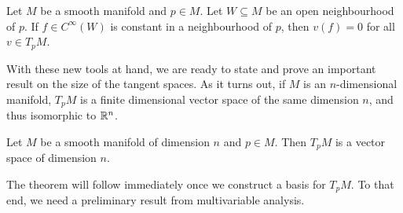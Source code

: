 \begin{corollary}\label{cor:derzero}
	Let $M$ be a smooth manifold and $p\in M$.
	Let $W\subseteq M$ be an open neighbourhood of $p$.
	If $f\in C^\infty(W)$ is constant in a neighbourhood of $p$, then $v(f) = 0$ for all $v\in T_p M$.
\end{corollary}

With these new tools at hand, we are ready to state and prove an important result on the size of the tangent spaces.
As it turns out, if $M$ is an $n$-dimensional manifold, $T_pM$ is a finite dimensional vector space of the same dimension $n$, and thus isomorphic to $\mathbb{R}^n$.

\begin{theorem}\label{thm:dimensionTpM}
	Let $M$ be a smooth manifold of dimension $n$ and $p\in M$.
	Then $T_pM$ is a vector space of dimension $n$.
\end{theorem}

The theorem will follow immediately once we construct a basis for $T_pM$.
To that end, we need a preliminary result from multivariable analysis.


